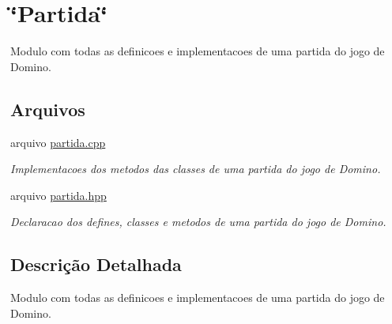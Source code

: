 \hypertarget{group__MOD__PARTIDA}{
\section{\char`\"{}Partida\char`\"{}}
\label{group__MOD__PARTIDA}
}


Modulo com todas as definicoes e implementacoes de uma partida do jogo de Domino.  


\subsection*{Arquivos}
\begin{DoxyCompactItemize}
\item 
arquivo \hyperlink{partida_8cpp}{partida.cpp}


\begin{DoxyCompactList}\small\item\em Implementacoes dos metodos das classes de uma partida do jogo de Domino. \item\end{DoxyCompactList}

\item 
arquivo \hyperlink{partida_8hpp}{partida.hpp}


\begin{DoxyCompactList}\small\item\em Declaracao dos defines, classes e metodos de uma partida do jogo de Domino. \item\end{DoxyCompactList}

\end{DoxyCompactItemize}


\subsection{Descrição Detalhada}
Modulo com todas as definicoes e implementacoes de uma partida do jogo de Domino. 